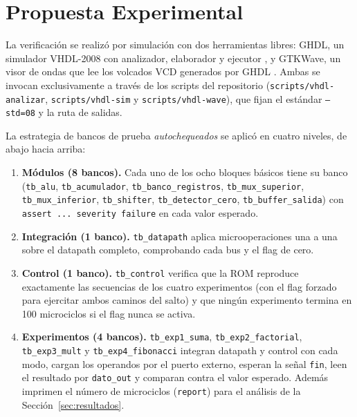 \documentclass[llncs]{llncs}
\begin{document}
\section{Propuesta Experimental}
\label{sec:propuesta}

La verificación se realizó por simulación con dos herramientas libres:
GHDL, un simulador VHDL-2008 con analizador, elaborador y ejecutor
\cite{ghdl-docs}, y GTKWave, un visor de ondas que lee los volcados
VCD generados por GHDL \cite{gtkwave-docs}. Ambas se invocan
exclusivamente a través de los scripts del repositorio
(\texttt{scripts/vhdl-analizar}, \texttt{scripts/vhdl-sim} y
\texttt{scripts/vhdl-wave}), que fijan el estándar \texttt{--std=08} y
la ruta de salidas.

La estrategia de bancos de prueba \emph{autochequeados} se aplicó en
cuatro niveles, de abajo hacia arriba:

\begin{enumerate}
  \item \textbf{Módulos (8 bancos).} Cada uno de los ocho bloques
    básicos tiene su banco (\texttt{tb\_alu}, \texttt{tb\_acumulador},
    \texttt{tb\_banco\_registros}, \texttt{tb\_mux\_superior},
    \texttt{tb\_mux\_inferior}, \texttt{tb\_shifter},
    \texttt{tb\_detector\_cero}, \texttt{tb\_buffer\_salida}) con
    \texttt{assert ... severity failure} en cada valor esperado.
  \item \textbf{Integración (1 banco).} \texttt{tb\_datapath} aplica
    microoperaciones una a una sobre el datapath completo, comprobando
    cada bus y el flag de cero.
  \item \textbf{Control (1 banco).} \texttt{tb\_control} verifica que la
    ROM reproduce exactamente las secuencias de los cuatro experimentos
    (con el flag forzado para ejercitar ambos caminos del salto) y que
    ningún experimento termina en 100 microciclos si el flag nunca se
    activa.
  \item \textbf{Experimentos (4 bancos).} \texttt{tb\_exp1\_suma},
    \texttt{tb\_exp2\_factorial}, \texttt{tb\_exp3\_mult} y
    \texttt{tb\_exp4\_fibonacci} integran datapath y control con cada
    modo, cargan los operandos por el puerto externo, esperan la señal
    \texttt{fin}, leen el resultado por \texttt{dato\_out} y comparan
    contra el valor esperado. Además imprimen el número de microciclos
    (\texttt{report}) para el análisis de la Sección~\ref{sec:resultados}.
\end{enumerate}
\end{document}
